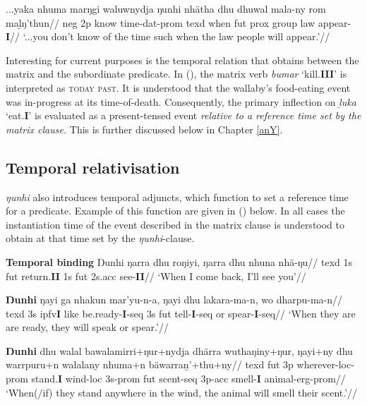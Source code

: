 \a\begingl\gla ...yaka nhuma marŋgi waluwnydja ŋunhi nhätha dhu dhuwal mala-ny rom maḻŋ'thun//
\glb \gls{neg} 2p know time-\gls{dat}-\gls{prom} \gls{texd} when \gls{fut} \gls{prox} group law appear-\textbf{I}//
\glft`...you don't know of the time such when the law people will appear.'\trailingcitation{[Mathuyu~25.13]}//\endgl

\xe

Interesting for current purposes is the temporal relation that obtains between the matrix and the subordinate predicate. In (), the matrix verb \textit{bumar} `kill.\textbf{III}' is interpreted as \textsc{today past}. It is understood that the wallaby's food-eating event was in-progress at its time-of-death. Consequently, the primary inflection on \textit{ḻuka} `eat.\textbf{I}' is evaluated as a present-tensed event \textit{relative to a reference time set by the matrix clause.} This is further discussed below in Chapter \ref{anY}.

\subsection{Temporal relativisation}

\textit{ŋunhi} also introduces temporal adjuncts, which function to set a reference time for a predicate. Example of this function are given in (\nextx) below. In all cases the instantiation time of the event described in the matrix clause is understood to obtain at that time set by the \textit{ŋunhi}-clause.

\pex \textbf{Temporal binding}
\a\begingl\gla Ŋunhi ŋarra dhu roŋiyi, ŋarra dhu nhuna nhä-ŋu//
\glb \gls{texd} 1s \gls{fut} return.\textbf{II} 1s \gls{fut} 2s.\gls{acc} see-\textbf{II}//
\glft`When I come back, I'll see you'\trailingcitation{[MD 20180802]}//\endgl

\a\begingl\gla \textbf{Ŋunhi} ŋayi ga nhakun mar'yu-n-a, ŋayi dhu lakara-ma-n, wo dharpu-ma-n//
\glb \gls{texd} 3s \gls{ipfv}\textbf{I} like be.ready-\textbf{I}-\gls{seq} 3s \gls{fut} tell-\textbf{I}-\gls{seq} or spear-\textbf{I}-\gls{seq}//
\glft `When they are are ready, they will speak or spear.'//\endgl

\a\begingl\gla \textbf{Ŋunhi} dhu walal bawalamirri+ŋur+nydja dhärra wuthaŋiny+ŋur, ŋayi+ny dhu warrpuru+n walalany nhuma+n bäwarraṉ'+thu+ny//
\glb \gls{texd} \gls{fut} 3p wherever-\gls{loc}-\gls{prom} stand.\textbf{I} wind-\gls{loc} 3s-\gls{prom} \gls{fut} scent-\gls{seq} 3p-\gls{acc} smell-\textbf{I} animal-\gls{erg}-\gls{prom}//
\glft`When(/if) they stand anywhere in the wind, the animal will smell their scent.'//\endgl


